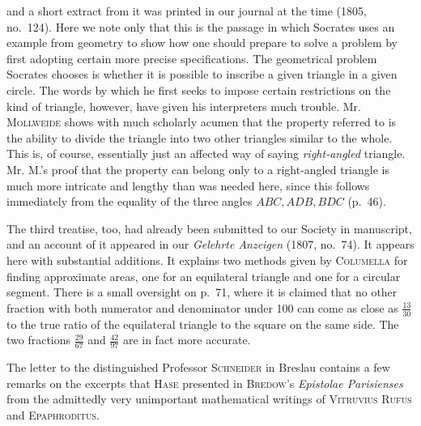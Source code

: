 %
and a short extract from it was printed in our journal at the time (1805, no.~124). Here we note only that this is the passage in which Socrates uses an example from geometry to show how one should prepare to solve a problem by first adopting certain more precise specifications. The geometrical problem Socrates chooses is whether it is possible to inscribe a given triangle in a given circle. The words by which he first seeks to impose certain restrictions on the kind of triangle, however, have given his interpreters much trouble. Mr. \textsc{Mollweide} shows with much scholarly acumen that the property referred to is the ability to divide the triangle into two other triangles similar to the whole. This is, of course, essentially just an affected way of saying \textit{right-angled} triangle. Mr. M.'s proof that the property can belong only to a right-angled triangle is much more intricate and lengthy than was needed here, since this follows immediately from the equality of the three angles \(ABC,ADB,BDC\) (p.~46).

The third treatise, too, had already been submitted to our Society in manuscript, and an account of it appeared in our \textit{Gelehrte Anzeigen} (1807, no.~74). It appears here with substantial additions. It explains two methods given by \textsc{Columella} for finding approximate areas, one for an equilateral triangle and one for a circular segment. There is a small oversight on p.~71, where it is claimed that no other fraction with both numerator and denominator under 100 can come as close as \(\frac{13}{30}\) to the true ratio of the equilateral triangle to the square on the same side. The two fractions \(\frac{29}{67}\) and \(\frac{42}{97}\) are in fact more accurate.

The letter to the distinguished Professor \textsc{Schneider} in Breslau contains a few remarks on the excerpts that \textsc{Hase} presented in \textsc{Bredow}’s \textit{Epistolae Parisienses} from the admittedly very unimportant mathematical writings of \textsc{Vitruvius Rufus} and \textsc{Epaphroditus}.
